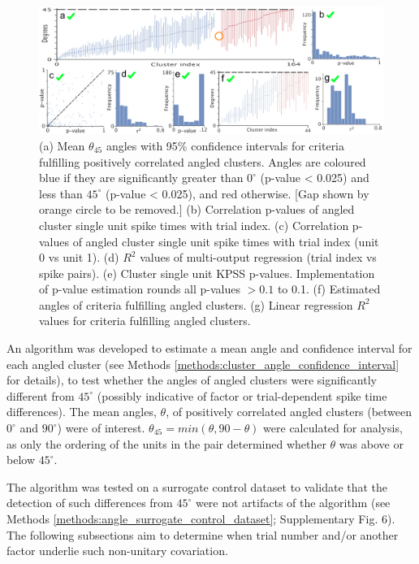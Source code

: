 \documentclass{article}
\begin{document}
\begin{figure}[t!]
\centering
\includegraphics[width=\textwidth]{Figure4.pdf}
\caption{(a) Mean $\theta_{45}$ angles with 95\% confidence intervals for criteria fulfilling positively correlated angled clusters. Angles are coloured blue if they are significantly greater than $0^{\circ}$ (p-value < 0.025) and less than $45^{\circ}$ (p-value < 0.025), and red otherwise. [Gap shown by orange circle to be removed.] (b) Correlation p-values of angled cluster single unit spike times with trial index. (c) Correlation p-values of angled cluster single unit spike times with trial index (unit 0 vs unit 1). (d) $R^2$ values of multi-output regression (trial index vs spike pairs). (e) Cluster single unit KPSS p-values. Implementation of p-value estimation rounds all p-values $>0.1$ to 0.1. (f) Estimated angles of criteria fulfilling angled clusters. (g) Linear regression $R^2$ values for criteria fulfilling angled clusters.}
\label{fig:universe}
\end{figure}

An algorithm was developed to estimate a mean angle and confidence interval for each angled cluster (see Methods \ref{methods:cluster_angle_confidence_interval} for details), to test whether the angles of angled clusters were significantly different from $45^{\circ}$ (possibly indicative of factor or trial-dependent spike time differences). The mean angles, $\theta$, of positively correlated angled clusters (between $0^{\circ}$ and $90^{\circ}$) were of interest. $\theta_{45} = min(\theta, 90-\theta)$ were calculated for analysis, as only the ordering of the units in the pair determined whether $\theta$ was above or below $45^{\circ}$.

The algorithm was tested on a surrogate control dataset to validate that the detection of such differences from $45^{\circ}$ were not artifacts of the algorithm (see Methods \ref{methods:angle_surrogate_control_dataset}; Supplementary Fig. 6). The following subsections aim to determine when trial number and/or another factor underlie such non-unitary covariation.
\end{document}

